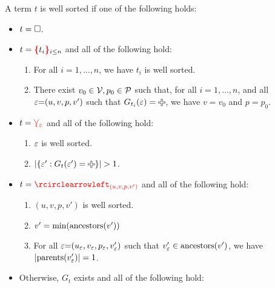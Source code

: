 \begin{definition}
  A term $t$ is well sorted if one of the following holds:
  \begin{itemize}
    \item $t = \square$.
    \item $t = \textcolor{red}{\textbf{\{}}t_i\textcolor{red}{\textbf{\}}}_{i \leq n}$ and all of the following hold:
      \begin{enumerate}
        \item For all $i = 1, \ldots, n$, we have $t_i$ is well sorted.
        \item
          There exist $v_0 \in \mathcal{V}, p_0 \in \mathcal{P}$ such that,
          for all $i = 1, \ldots, n$,
          and all $\varepsilon{=}(u, v, p, v')$ such that $G_{t_i}(\e) = \Plus$,
          we have $v = v_0$ and $p = p_0$.
      \end{enumerate}
    \item $t = \textcolor{red}{\curlyveedownarrow_{\varepsilon}}$ and all of the following hold:
      \begin{enumerate}
        \item $\varepsilon$ is well sorted.
        \item $\SizeOf{\SetOf{\e' \SuchThat{G_t(\e') = \Plus}}} > 1$.
      \end{enumerate}
    \item $t = \cycleVertex{(u, v, p, v')}$ and all of the following hold:
      \begin{enumerate}
        \item $(u, v, p, v')$ is well sorted.
        \item $v' = \operatorname{\text{min}}\mathopen{}\left(\operatorname{\text{ancestors}}\mathopen{}\left(v'\right)\mathclose{}\right)\mathclose{}$
        \item For all $\varepsilon{=}(u_{\varepsilon}, v_{\varepsilon}, p_{\varepsilon}, v_{\varepsilon}')$
          such that $v_{\varepsilon}' \in \operatorname{\text{ancestors}}\mathopen{}\left(v'\right)\mathclose{}$,
          we have $\left\lvert\operatorname{\text{parents}}\mathopen{}\left(v_{\varepsilon}'\right)\mathclose{}\right\rvert = 1$.
      \end{enumerate}
    \item Otherwise, $G_t$ exists and all of the following hold:
      \begin{enumerate}

\end{enumerate}
\end{itemize}
\end{definition}
